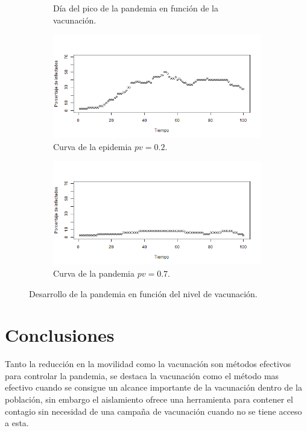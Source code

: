 \documentclass{article}
\begin{document}
\begin{figure}
\begin{subfigure}[]{.4\linewidth}
         \caption{Día del pico de la pandemia en función de la vacunación.}
         \label{3b}
     \end{subfigure}
     \begin{subfigure}[]{.5\linewidth}
     \centering
         \includegraphics[width=\linewidth]{p6_r1_0.2.png}
         \caption{Curva de la epidemia $pv=0.2$.}
         \label{3c}
     \end{subfigure}
       \begin{subfigure}[]{.5\linewidth}
       \centering
         \includegraphics[width=\linewidth]{p6_r1_0.7.png}
         \caption{Curva de la pandemia $pv=0.7$.}
         \label{3d}
     \end{subfigure}
     \caption{Desarrollo de la pandemia en función del nivel de vacunación.}
        \label{F3}
\end{figure}

\section{Conclusiones}
Tanto la reducción en la movilidad como la vacunación son métodos efectivos para controlar la pandemia, se destaca la vacunación como el método mas efectivo cuando se consigue un alcance importante de la vacunación dentro de la población, sin embargo el aislamiento ofrece una herramienta para contener el contagio sin necesidad de una campaña de vacunación cuando no se tiene acceso a esta.


\end{document}
